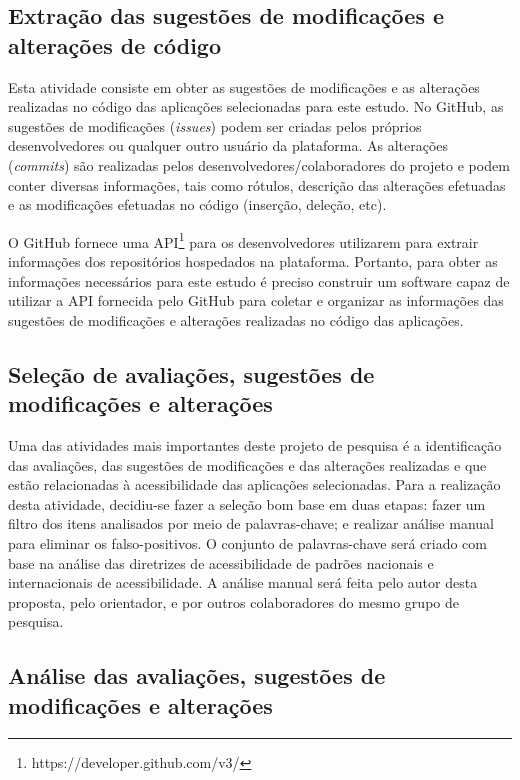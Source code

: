\subsection{Extração das sugestões de modificações e alterações de código}
\label{sec:extracaomodificacoes}

Esta atividade consiste em obter as sugestões de modificações e as alterações realizadas no código das aplicações selecionadas para este estudo. 
No GitHub, as sugestões de modificações (\textit{issues}) podem ser criadas pelos próprios desenvolvedores ou qualquer outro usuário da plataforma.
As alterações (\textit{commits}) são realizadas pelos desenvolvedores/colaboradores do projeto e podem conter diversas informações, tais como rótulos, descrição das alterações efetuadas e as modificações efetuadas no código (inserção, deleção, etc). 

O GitHub fornece uma API\footnote{https://developer.github.com/v3/} para os desenvolvedores utilizarem para extrair informações dos repositórios hospedados na plataforma. Portanto, para obter as informações necessários para este estudo é preciso construir um software capaz de utilizar a API fornecida pelo GitHub  para coletar e organizar as informações das sugestões de modificações e alterações realizadas no código das aplicações. 

\subsection{Seleção de avaliações, sugestões de modificações e alterações}
\label{sec:selecao}

Uma das atividades mais importantes deste projeto de pesquisa é a identificação das avaliações, das sugestões de modificações e das alterações realizadas e que estão relacionadas à acessibilidade das aplicações selecionadas.
Para a realização desta atividade, decidiu-se fazer a seleção bom base em duas etapas: 
fazer um filtro dos itens analisados por meio de palavras-chave; e realizar análise manual para eliminar os falso-positivos. 
O conjunto de palavras-chave será criado com base na análise das diretrizes de acessibilidade de padrões nacionais e internacionais de acessibilidade.
A análise manual será feita pelo autor desta proposta, pelo orientador, e por outros colaboradores do mesmo grupo de pesquisa. 


\subsection{Análise das avaliações, sugestões de modificações e alterações}
\label{sec:analise}

